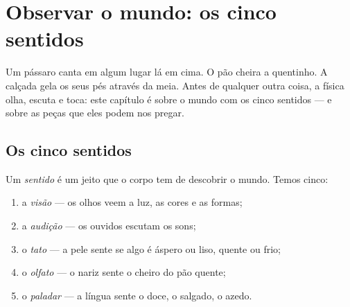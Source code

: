 \chapter{Observar o mundo: os cinco sentidos}\label{ch:g1:five-senses}

Um pássaro canta em algum lugar lá em cima. O pão cheira a quentinho.
A calçada gela os seus pés através da meia. Antes de qualquer outra
coisa, a física olha, escuta e toca: este capítulo é sobre  o
mundo com os cinco sentidos --- e sobre as peças que eles podem nos
pregar.

\section{Os cinco sentidos}

\begin{definition}\label{def:g1:five-senses:senses}
Um \emph{sentido} é um jeito que o corpo tem de
descobrir o mundo. Temos cinco:
\begin{enumerate}
  \item a \emph{visão} --- os olhos veem a luz, as cores
        e as formas;
  \item a \emph{audição} --- os ouvidos escutam os
        sons;
  \item o \emph{tato} --- a pele sente se algo é áspero ou
        liso, quente ou frio;
  \item o \emph{olfato} --- o nariz sente o cheiro do
        pão quente;
  \item o \emph{paladar} --- a língua sente o doce, o
        salgado, o azedo.
\end{enumerate}
\end{definition}

